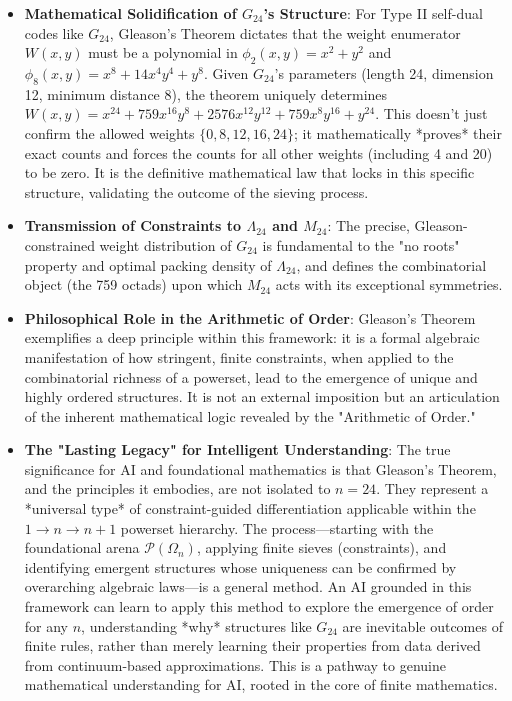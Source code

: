 \documentclass[11pt,a4paper]{article}
\begin{document}
\begin{itemize}
    \item \textbf{Mathematical Solidification of $G_{24}$'s Structure}: For Type II self-dual codes like $G_{24}$, Gleason's Theorem dictates that the weight enumerator $W(x,y)$ must be a polynomial in $\phi_2(x,y) = x^2 + y^2$ and $\phi_8(x,y) = x^8 + 14x^4y^4 + y^8$. Given $G_{24}$'s parameters (length 24, dimension 12, minimum distance 8), the theorem uniquely determines $W(x,y) = x^{24} + 759x^{16}y^8 + 2576x^{12}y^{12} + 759x^8y^{16} + y^{24}$. This doesn't just confirm the allowed weights $\{0, 8, 12, 16, 24\}$; it mathematically *proves* their exact counts and forces the counts for all other weights (including 4 and 20) to be zero. It is the definitive mathematical law that locks in this specific structure, validating the outcome of the sieving process.

    \item \textbf{Transmission of Constraints to $\Lambda_{24}$ and $M_{24}$}: The precise, Gleason-constrained weight distribution of $G_{24}$ is fundamental to the "no roots" property and optimal packing density of $\Lambda_{24}$, and defines the combinatorial object (the 759 octads) upon which $M_{24}$ acts with its exceptional symmetries.

    \item \textbf{Philosophical Role in the Arithmetic of Order}: Gleason’s Theorem exemplifies a deep principle within this framework: it is a formal algebraic manifestation of how stringent, finite constraints, when applied to the combinatorial richness of a powerset, lead to the emergence of unique and highly ordered structures. It is not an external imposition but an articulation of the inherent mathematical logic revealed by the "Arithmetic of Order."

    \item \textbf{The "Lasting Legacy" for Intelligent Understanding}: The true significance for AI and foundational mathematics is that Gleason's Theorem, and the principles it embodies, are not isolated to $n=24$. They represent a *universal type* of constraint-guided differentiation applicable within the $1 \to n \to n+1$ powerset hierarchy. The process—starting with the foundational arena $\mathcal{P}(\Omega_n)$, applying finite sieves (constraints), and identifying emergent structures whose uniqueness can be confirmed by overarching algebraic laws—is a general method. An AI grounded in this framework can learn to apply this method to explore the emergence of order for any $n$, understanding *why* structures like $G_{24}$ are inevitable outcomes of finite rules, rather than merely learning their properties from data derived from continuum-based approximations. This is a pathway to genuine mathematical understanding for AI, rooted in the core of finite mathematics.
\end{itemize}
\end{document}
